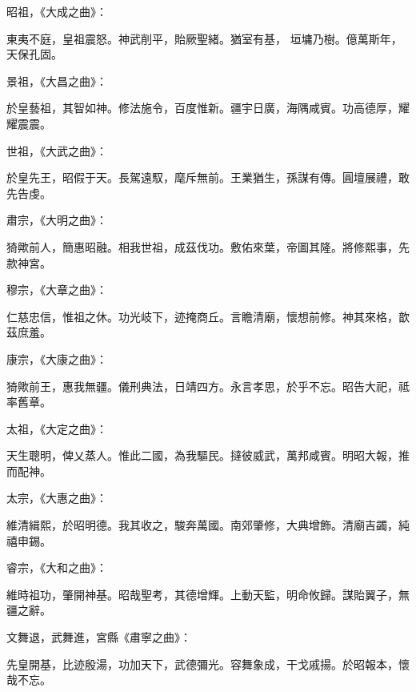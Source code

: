 \begin{pinyinscope}
 昭祖，《大成之曲》：



 東夷不庭，皇祖震怒。神武削平，貽厥聖緒。猶室有基，
 垣墉乃樹。億萬斯年，天保孔固。



 景祖，《大昌之曲》：



 於皇藝祖，其智如神。修法施令，百度惟新。疆宇日廣，海隅咸賓。功高德厚，耀耀震震。



 世祖，《大武之曲》：



 於皇先王，昭假于天。長駕遠馭，麾斥無前。王業猶生，孫謀有傳。圓壇展禮，敢先告虔。



 肅宗，《大明之曲》：



 猗歟前人，簡惠昭融。相我世祖，成茲伐功。敷佑來葉，帝圖其隆。將修熙事，先款神宮。



 穆宗，《大章之曲》：



 仁慈忠信，惟祖之休。功光岐下，迹掩商丘。言瞻清廟，懷想前修。神其來格，歆茲庶羞。



 康宗，《大康之曲》：



 猗歟前王，惠我無疆。儀刑典法，日靖四方。永言孝思，於乎不忘。昭告大祀，祗率舊章。



 太祖，《大定之曲》：



 天生聰明，俾乂蒸人。惟此二國，為我驅民。撻彼威武，萬邦咸賓。明昭大報，推而配神。



 太宗，《大惠之曲》：



 維清緝熙，於昭明德。我其收之，駿奔萬國。南郊肇修，大典增飾。清廟吉蠲，純禧申錫。



 睿宗，《大和之曲》：



 維時祖功，肇開神基。昭哉聖考，其德增輝。上動天監，明命攸歸。謀貽翼子，無疆之辭。



 文舞退，武舞進，宮縣《肅寧之曲》：



 先皇開基，比迹殷湯，功加天下，武德彌光。容舞象成，干戈戚揚。於昭報本，懷哉不忘。




\end{pinyinscope}
